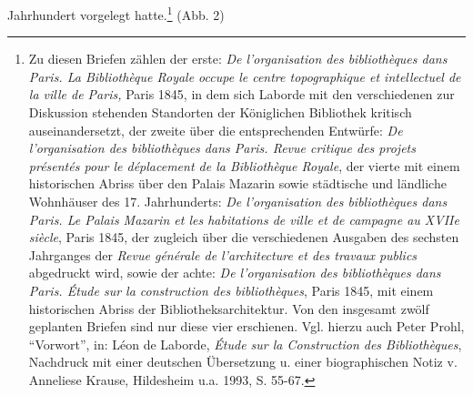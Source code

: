Jahrhundert vorgelegt hatte.\footnote{Zu diesen Briefen zählen der
  erste: \emph{De l'organisation des bibliothèques dans Paris. La
  Bibliothèque Royale occupe le centre topographique et intellectuel de
  la ville de Paris,} Paris 1845, in dem sich Laborde mit den
  verschiedenen zur Diskussion stehenden Standorten der Königlichen
  Bibliothek kritisch auseinandersetzt, der zweite über die
  entsprechenden Entwürfe: \emph{De l'organisation des bibliothèques
  dans Paris. Revue critique des projets présentés pour le déplacement
  de la Bibliothèque Royale}, der vierte mit einem historischen Abriss
  über den Palais Mazarin sowie städtische und ländliche Wohnhäuser des
  17. Jahrhunderts: \emph{De l'organisation des bibliothèques dans
  Paris. Le Palais Mazarin et les habitations de ville et de campagne au
  XVIIe siècle}, Paris 1845, der zugleich über die verschiedenen
  Ausgaben des sechsten Jahrganges der \emph{Revue générale de
  l'architecture et des travaux publics} abgedruckt wird, sowie der
  achte: \emph{De l'organisation des bibliothèques dans Paris. Étude sur
  la construction des bibliothèques}, Paris 1845, mit einem historischen
  Abriss der Bibliotheksarchitektur. Von den insgesamt zwölf geplanten
  Briefen sind nur diese vier erschienen. Vgl. hierzu auch Peter Prohl,
  \enquote{Vorwort}, in: Léon de Laborde, \emph{Étude sur la
  Construction des Bibliothèques}, Nachdruck mit einer deutschen
  Übersetzung u. einer biographischen Notiz v. Anneliese Krause,
  Hildesheim u.a. 1993, S. 55-67.} (Abb. 2)

